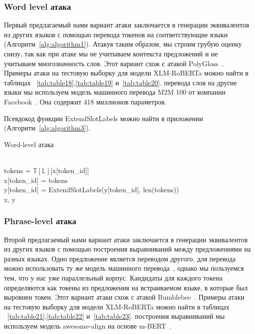 \subsubsection{Word level атака}
Первый предлагаемый нами вариант атаки заключается в генерации эквивалентов из других языков с помощью перевода токенов на соответствующие языки (Алгоритм~\eqref{alg:algorithm1}).
Атакуя таким образом, мы строим грубую оценку снизу, так как при атаке мы не учитываем контекста предложений и не учитываем многозначность слов.
Этот вариант схож с атакой PolyGloss~\cite{Tan2021CodeMixingOS}.
Примеры атаки на тестовую выборку для модели XLM-RoBERTa можно найти в таблицах ~\eqref{tab:table18},\eqref{tab:table19} и~\eqref{tab:table20}.
 перевода слов на другие языки мы используем модель машинного перевода M2M 100 от компании Facebook~\cite{Fan2020BeyondEM}.
Она содержит 418 миллионов параметров.
\par Псевдокод функции ExtendSlotLabels можно найти в приложении (Алгоритм~\eqref{alg:algorithm3}).

\begin{algorithm}
    \caption{Word-level атака}
    \begin{algorithmic}
            \ind{}
                    \\
                    \ind\ind tokens = $\mathbb{T}[\mathbb{L}]$[x[token\_id]]\\
                    \ind\ind x[token\_id] = tokens\\
                    \ind\ind y[token\_id] = ExtendSlotLabels(y[token\_id], len(tokens))
            \EndIf \\
            \ind\Return x, y
        \EndFunction
    \end{algorithmic}\label{alg:algorithm1}
\end{algorithm}



\subsubsection{Phrase-level атака}
Второй предлагаемый нами вариант атаки заключается в генерации эквивалентов из других языков с помощью построения выравниваний между предложениями на разных языках.
Одно предложение является переводом другого, для перевода можно использовать ту же модель машинного перевода~\cite{Fan2020BeyondEM}, однако мы пользуемся тем, что у нас уже параллельный корпус.
Кандидаты для каждого токена определяются как токены из предложения на встраиваемом языке, в которые был выровнен токен.
Этот вариант атаки схож с атакой Bumblebee~\cite{Tan2021CodeMixingOS}.
Примеры атаки на тестовую выборку для модели XLM-RoBERTa можно найти в таблицах ~\eqref{tab:table21},\eqref{tab:table22} и~\eqref{tab:table23}.
 построения выравниваний мы используем модель awesome-align на основе m-BERT~\cite{Dou2021WordAB}.

